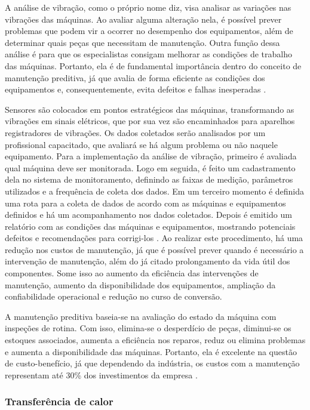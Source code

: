 A análise de vibração, como o próprio nome diz, visa analisar as variações nas vibrações das máquinas. Ao avaliar alguma alteração nela, é possível prever problemas que podem vir a ocorrer no desempenho dos equipamentos, além de determinar quais peças que necessitam de manutenção. Outra função dessa análise é para que os especialistas consigam melhorar as condições de trabalho das máquinas. Portanto, ela é de fundamental importância dentro do conceito de manutenção preditiva, já que avalia de forma eficiente as condições dos equipamentos e, consequentemente, evita defeitos e falhas inesperadas \cite{nobrega2014}.

Sensores são colocados em pontos estratégicos das máquinas, transformando as vibrações em sinais elétricos, que por sua vez são encaminhados para aparelhos registradores de vibrações. Os dados coletados serão analisados por um profissional capacitado, que avaliará se há algum problema ou não naquele equipamento. Para a implementação da análise de vibração, primeiro é avaliada qual máquina deve ser monitorada. Logo em seguida, é feito um cadastramento dela no sistema de monitoramento, definindo as faixas de medição, parâmetros utilizados e a frequência de coleta dos dados. Em um terceiro momento é definida uma rota para a coleta de dados de acordo com as máquinas e equipamentos definidos e há um acompanhamento nos dados coletados. Depois é emitido um relatório com as condições das máquinas e equipamentos, mostrando potenciais defeitos e recomendações para corrigi-los \cite{nobrega2014}.
Ao realizar este procedimento, há uma redução nos custos de manutenção, já que é possível prever quando é necessário a intervenção de manutenção, além do já citado prolongamento da vida útil dos componentes. Some isso ao aumento da eficiência das intervenções de manutenção, aumento da disponibilidade dos equipamentos, ampliação da confiabilidade operacional e redução no curso de conversão.


A manutenção preditiva baseia-se na avaliação do estado da máquina com inspeções de rotina. Com isso, elimina-se o desperdício de peças, diminui-se os estoques associados, aumenta a eficiência nos reparos, reduz ou elimina problemas e aumenta a disponibilidade das máquinas. Portanto, ela é excelente na questão de custo-benefício, já que dependendo da indústria, os custos com a manutenção representam até 30\% dos investimentos da empresa \cite{zuniga2011}.
\subsubsection{Transferência de calor}

